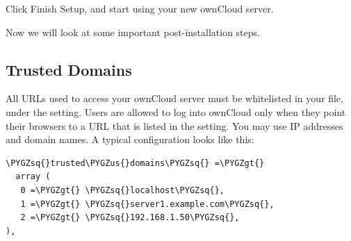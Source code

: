 \documentclass[letterpaper,10pt,english]{sphinxmanual}
\def\PYGZus{\char`\_}
\def\PYGZgt{\char`\>}
\def\PYGZsq{\char`\'}
\begin{document}
Click Finish Setup, and start using your new ownCloud server.
\begin{figure}[htbp]
\centering

\end{figure}

Now we will look at some important post-installation steps.


\subsection{Trusted Domains}
\label{installation/installation_wizard:trusted-domains-label}\label{installation/installation_wizard:trusted-domains}
All URLs used to access your ownCloud server must be whitelisted in your
 file, under the  setting. Users
are allowed to log into ownCloud only when they point their browsers to a
URL that is listed in the  setting. You may use IP addresses
and domain names. A typical configuration looks like this:

\begin{Verbatim}[commandchars=\\\{\}]
\PYGZsq{}trusted\PYGZus{}domains\PYGZsq{} =\PYGZgt{}
  array (
   0 =\PYGZgt{} \PYGZsq{}localhost\PYGZsq{},
   1 =\PYGZgt{} \PYGZsq{}server1.example.com\PYGZsq{},
   2 =\PYGZgt{} \PYGZsq{}192.168.1.50\PYGZsq{},
),
\end{Verbatim}
\end{document}
